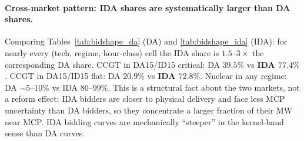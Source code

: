 \documentclass[11pt,a4paper]{article}
\newcommand{\code}[1]{\nolinkurl{#1}}
\begin{document}
\begin{table}[H]
\centering\scriptsize
\caption{\textbf{DA bid-shape: share (\%) of unit's offered MW within [MCP$\pm 50$] EUR/MWh, per regime.} Source: \code{tab\_bidshape\_DA\_by\_regime\_normalized.tex}.}
\label{tab:bidshape_da}
\setlength{\tabcolsep}{4pt}

\end{table}

\begin{table}[H]
\centering\scriptsize
\caption{\textbf{IDA bid-shape: same normalised share metric.} Same construction as Table~\ref{tab:bidshape_da}, applied to the IDA bid stack (idet+icab, sessions pooled per ISP). Source: \code{tab\_bidshape\_IDA\_by\_regime\_normalized.tex}.}
\label{tab:bidshape_ida}
\setlength{\tabcolsep}{4pt}

\end{table}

\paragraph{Cross-market pattern: IDA shares are systematically larger than DA shares.} Comparing Tables~\ref{tab:bidshape_da} (DA) and \ref{tab:bidshape_ida} (IDA): for nearly every (tech, regime, hour-class) cell the IDA share is $1.5$--$3\times$ the corresponding DA share. CCGT in DA15/ID15 critical: DA $39.5\%$ vs \textbf{IDA $77.4\%$}. CCGT in DA15/ID15 flat: DA $20.9\%$ vs \textbf{IDA $72.8\%$}. Nuclear in any regime: DA $\sim 5$--$10\%$ vs IDA $80$--$99\%$. This is a structural fact about the two markets, not a reform effect: IDA bidders are closer to physical delivery and face less MCP uncertainty than DA bidders, so they concentrate a larger fraction of their MW near MCP. IDA bidding curves are mechanically ``steeper'' in the kernel-band sense than DA curves.
\end{document}
